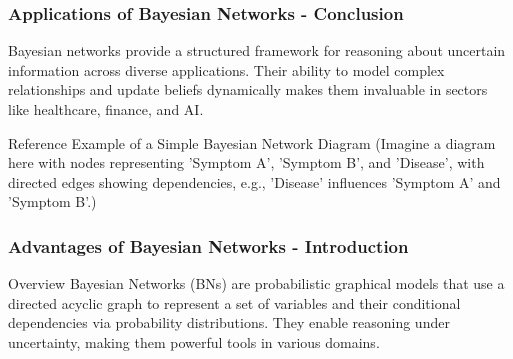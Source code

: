 \documentclass[aspectratio=169]{beamer}
\begin{document}
\begin{frame}[fragile]
  \frametitle{Applications of Bayesian Networks - Conclusion}
  Bayesian networks provide a structured framework for reasoning about uncertain information across diverse applications. Their ability to model complex relationships and update beliefs dynamically makes them invaluable in sectors like healthcare, finance, and AI.
  
  \begin{block}{Reference Example of a Simple Bayesian Network Diagram}
    (Imagine a diagram here with nodes representing 'Symptom A', 'Symptom B', and 'Disease', with directed edges showing dependencies, e.g., 'Disease' influences 'Symptom A' and 'Symptom B'.)
  \end{block}
\end{frame}

\begin{frame}[fragile]
    \frametitle{Advantages of Bayesian Networks - Introduction}
    \begin{block}{Overview}
        Bayesian Networks (BNs) are probabilistic graphical models that use a directed acyclic graph to represent a set of variables and their conditional dependencies via probability distributions. They enable reasoning under uncertainty, making them powerful tools in various domains.
    \end{block}
\end{frame}
\end{document}
